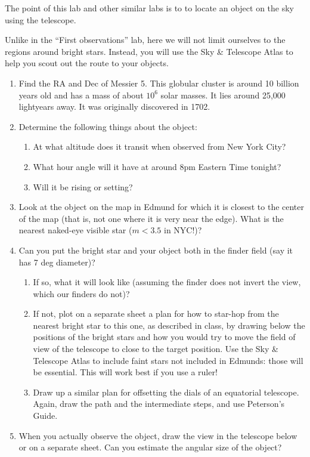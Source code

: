 
\noindent The point of this lab and other similar labs is to 
to locate an object on the sky using the telescope.

\noindent Unlike in the ``First observations'' lab, here we will not
limit ourselves to the regions around bright stars.  Instead, you will
use the Sky \& Telescope Atlas to help you scout out the route to your
objects.  

\begin{enumerate}  
\item Find the RA and Dec of Messier 5. This globular cluster is
around 10 billion years old and has a mass of about $10^6$ solar
  masses. It lies around 25,000 lightyears away. It was originally
  discovered in 1702. 
\item Determine the following things about the object:
\begin{enumerate}
\item At what altitude does it transit when observed from New York City?
\item What hour angle will it have at around 
8pm Eastern Time tonight?
\item Will it be rising or setting?
\end{enumerate}
\item Look at the object on the map in Edmund for which it is closest
to the center of the map (that is, not one where it is very near the
edge). What is the nearest naked-eye visible star ($m<3.5$ in NYC!)?
\vspace{40pt}
\item Can you put the bright star and your object both in the finder
field (say it has 7 deg diameter)? 
\begin{enumerate}
\item If so,  what it will look like
(assuming the finder does not invert the view, which our finders do
not)?
\vspace{180pt}
\clearpage
\item If not, plot on a separate sheet a plan for how to star-hop from
  the nearest bright star to this one, as described in class, by
  drawing below the positions of the bright stars and how you would
  try to move the field of view of the telescope to close to the
  target position. Use the Sky \& Telescope Atlas to include faint
  stars not included in Edmunds: those will be essential. This will
  work best if you use a ruler!
\item Draw up a similar plan for offsetting the dials of an equatorial
  telescope.  Again, draw the path and the intermediate steps, and use
  Peterson's Guide. 
\end{enumerate}
\vspace{220pt}
\item When you actually
  observe the object, draw the view in the telescope below or on a
  separate sheet. Can you estimate the angular size of the object? 
\end{enumerate}

\clearpage

~
